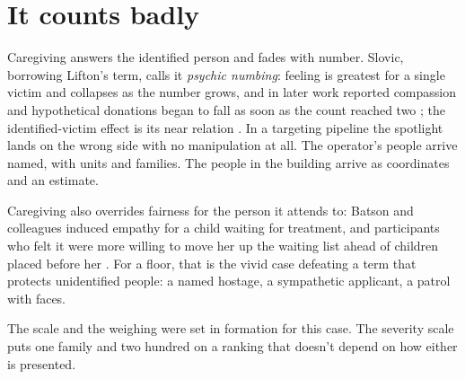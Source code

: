 \section{It counts badly}
\label{sec:20.9}
Caregiving answers the identified person and fades with number. Slovic, borrowing Lifton's term, calls it \emph{psychic numbing}: feeling is greatest for a single victim and collapses as the number grows, and in later work reported compassion and hypothetical donations began to fall as soon as the count reached two \autocite{slovic2007mass,vastfjall2014compassion}; the identified-victim effect is its near relation \autocite{kogut2005identified}.
In a targeting pipeline the spotlight lands on the wrong side with no manipulation at all. The operator's people arrive named, with units and families. The people in the building arrive as coordinates and an estimate.

Caregiving also overrides fairness for the person it attends to: Batson and colleagues induced empathy for a child waiting for treatment, and participants who felt it were more willing to move her up the waiting list ahead of children placed before her \autocite{batson1995immorality}.
For a floor, that is the vivid case defeating a term that protects unidentified people: a named hostage, a sympathetic applicant, a patrol with faces.

The scale and the weighing were set in formation for this case. The severity scale puts one family and two hundred on a ranking that doesn't depend on how either is presented.
